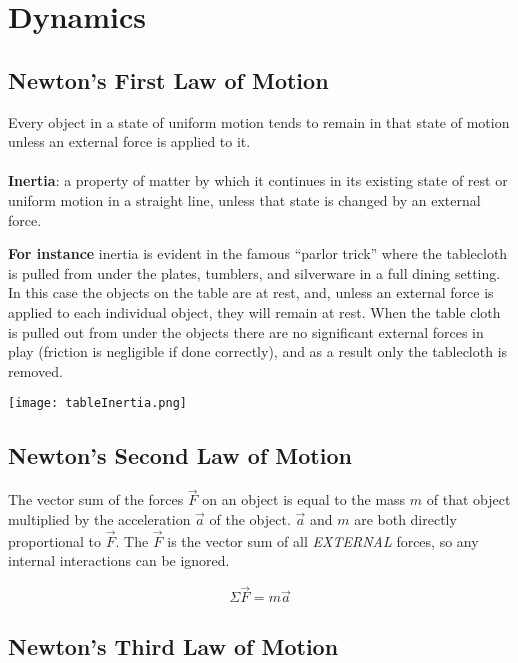 \documentclass{article}
\begin{document}
  \section{Dynamics}
  	\subsection{Newton's First Law of Motion}
  
  		Every object in a state of uniform motion tends to remain in that state of motion unless an external force is applied to it.
  		\\\\
  		\textbf{Inertia}: a property of matter by which it continues in its existing state of rest or uniform motion in a straight line, unless that state is changed by an external force.
  
  		\begin{multicols}{2}
  			\textbf{For instance} inertia is evident in the famous ``parlor trick'' where the  tablecloth is pulled from under the plates, tumblers, and silverware in a full dining setting. In this case the objects on the table are at rest, and, unless an external force is applied to each individual object, they will remain at rest. When the table cloth is pulled out from under the objects there are no significant external forces in play (friction is negligible if done correctly), and as a result only the tablecloth is removed.
  		\columnbreak
  			\centerline{\texttt{[image: tableInertia.png]}}
  		\end{multicols}
  
  	\subsection{Newton's Second Law of Motion}
  
  		The vector sum of the forces $\vec{F}$ on an object is equal to the mass $m$ of that object multiplied by the acceleration $\vec{a}$ of the object. $\vec{a}$ and $m$ are both directly proportional to $\vec{F}$. The $\vec{F}$ is the vector sum of all \emph{EXTERNAL} forces, so any internal interactions can be ignored.
  
  		\[
        	\Sigma\vec{F}=m\vec{a}
        \]
  
  	\subsection{Newton's Third Law of Motion}
  
\end{document}
